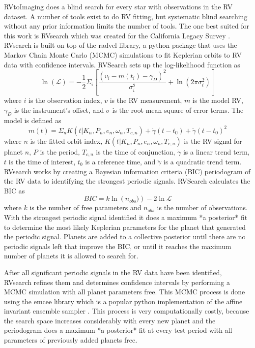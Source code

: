 RVtoImaging does a blind search for every star with observations in the RV
dataset. A number of tools exist to do RV fitting, but systematic
blind searching without any prior information limits the number of tools. The
one best suited for this work is RVsearch which was created for the California
Legacy Survey \citep{rosenthalCaliforniaLegacy2021}. RVsearch is built on top of the radvel library, a python
package that uses the Markov Chain Monte Carlo (MCMC) simulations to fit
Keplerian orbits to RV data with confidence intervals. RVSearch sets up the
log-likelihood function as \citep{rosenthalCaliforniaLegacy2021} 
\begin{equation}
\ln(\mathcal{L}) = -\frac{1}{2}
\Sigma_i \left[ \frac{\left(v_i - m(t_i) - \gamma_D\right)^2}{\sigma_i^2} +
\ln\left(2 \pi \sigma_i^2\right)\right]
  \label{eq:likelihoodfun}
\end{equation}
where $i$ is the observation index,
$v$ is the RV measurement, $m$ is the model RV, $\gamma_D$ is the instrument's
offset, and $\sigma$ is the root-mean-square of error terms. The model is
defined as 
\begin{equation}
m(t) = \Sigma_n K(t|K_n,P_n,e_n,\omega_n,T_{c,n}) +
\dot{\gamma}(t-t_0) + \ddot{\gamma}(t-t_0)^2
  \label{eq:rv_model}
\end{equation}
where $n$ is the fitted orbit
index, $K(t|K_n,P_n,e_n,\omega_n,T_{c,n})$ is the RV signal for planet $n$, $P$
is the period, $T_{c,n}$ is the time of conjunction, $\dot{\gamma}$ is a linear
trend term, $t$ is the time of interest, $t_0$ is a reference time, and
$\ddot{\gamma}$ is a quadratic trend term. RVsearch works by creating a
Bayesian information criteria (BIC) periodogram of the RV data to identifying
the strongest periodic signals. RVSearch calculates the BIC as 
\begin{equation}
BIC = k
\ln\left(n_{obs})\right) - 2\ln{\mathcal{L}}
  \label{eq:bic}
\end{equation}
where $k$ is the number of free
parameters and $n_{obs}$ is the number of observations. With the strongest
periodic signal identified it does a maximum *a posterior* fit to determine the
most likely Keplerian parameters for the planet that generated the periodic
signal. Planets are added to a collective posterior until there are no periodic
signals left that improve the BIC, or until it reaches the maximum number of
planets it is allowed to search for.

After all significant periodic signals in the RV data have been identified,
RVsearch refines them and determines confidence intervals by performing a MCMC
simulation with all planet parameters free. This MCMC process is done using the
emcee library \citep{emcee} which is a popular python implementation of the affine
invariant ensemble sampler \citep{Goodman2010}. This process is very computationally costly,
because the search space increases considerably with every new planet and the
periodogram does a maximum *a posterior* fit at every test period with all
parameters of previously added planets free.

